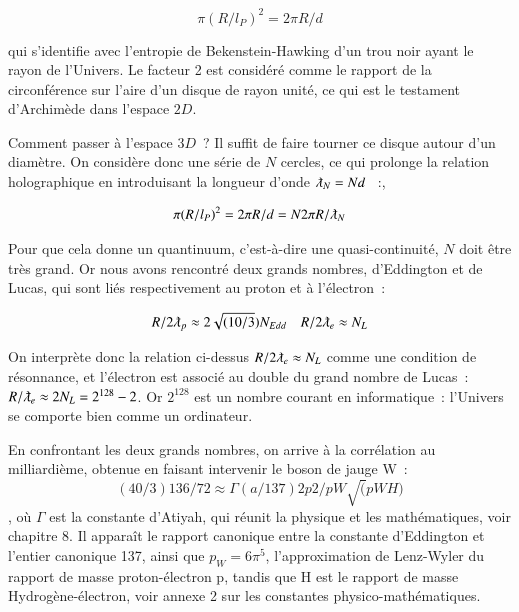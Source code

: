 \documentclass[a4paper,12pt]{article}
\begin{document}
\begin{equation}
\pi(R/l_P)^2 = 2 \pi R/d 
\end{equation}


qui s'identifie avec l'entropie de Bekenstein-Hawking d'un trou noir ayant le rayon de l'Univers. Le facteur 2 est considéré comme le rapport de la circonférence sur l'aire d'un disque de rayon unité, ce qui est le testament d'Archimède dans l'espace $2D$.


      Comment passer à l'espace $3D$ ? Il suffit de faire tourner ce disque autour d'un diamètre. On considère donc une série de $N$ cercles, ce qui prolonge la relation holographique en introduisant la longueur d'onde $\lambdabar_N = N d$  :,


\begin{equation}
\pi (R/l_P)^2 = 2 \pi R/d  = N 2\pi R/\lambdabar_N 
\end{equation}


Pour que cela donne un quantinuum, c'est-à-dire une quasi-continuité, $ N$ doit être très grand. Or nous avons rencontré deux grands nombres, d'Eddington et de Lucas, qui sont liés respectivement au proton et à l'électron :


\begin{equation}
R/2\lambdabar_p \approx 2\sqrt{(10/3})N_{Edd}     ~~~~   R/2\lambdabar_e \approx N_L 
\end{equation}



On interprète donc la relation ci-dessus $R/2\lambdabar_e \approx N_L$ comme une condition de résonnance, et l'électron est associé au double du grand nombre de Lucas : $R/\lambdabar_e \approx 2 N_L = 2^{128}-2$. Or $2^{128}$ est un nombre courant en informatique : l'Univers se comporte bien comme un ordinateur.

En confrontant les deux grands nombres, on arrive à la corrélation au milliardième, obtenue en faisant intervenir le boson de jauge W : 
\begin{equation}
(40/3)136/72 \approx \Gamma(a/137)2 p2/pW\sqrt(pW H)
\end{equation}, où $\Gamma$ est  la constante d'Atiyah, qui réunit la physique et les mathématiques, voir chapitre 8. Il apparaît le rapport canonique entre la constante d'Eddington et l'entier canonique 137, ainsi que $p_W = 6\pi^5$, l'approximation de Lenz-Wyler du rapport de masse proton-électron p, tandis que H est le rapport de masse Hydrogène-électron, voir annexe 2 sur les constantes physico-mathématiques. 
\end{document}
